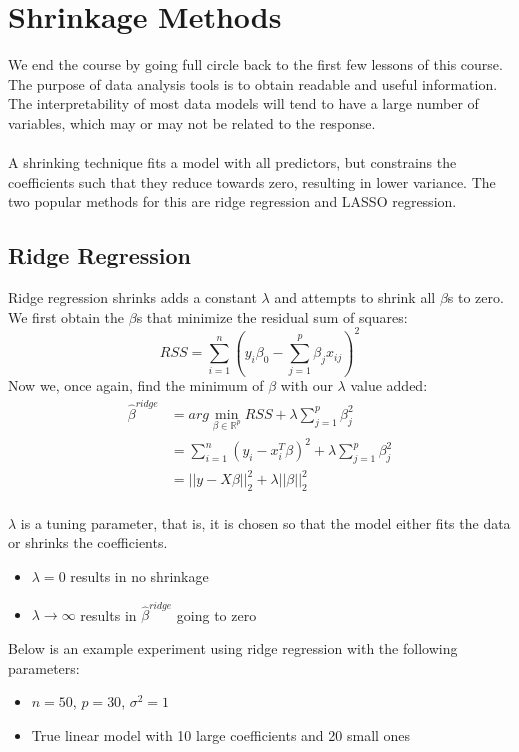 \documentclass[11pt]{article}
\begin{document}
\section{Shrinkage Methods}
We end the course by going full circle back to the first few lessons of this course. The purpose of data analysis tools is to obtain readable and useful information. The interpretability of most data models will tend to have a large number of variables, which may or may not be related to the response.
\\ \\
A shrinking technique fits a model with all predictors, but constrains the coefficients such that they reduce towards zero, resulting in lower variance. The two popular methods for this are ridge regression and LASSO regression.
\subsection{Ridge Regression}
Ridge regression shrinks adds a constant $\lambda$ and attempts to shrink all $\beta$s to zero. We first obtain the $\beta$s that minimize the residual sum of squares:
\begin{equation}
RSS = \sum_{i=1}^n(y_i  \beta_0 - \sum_{j=1}^p\beta_jx_{ij})^2
\end{equation}
Now we, once again, find the minimum of $\beta$ with our $\lambda$ value added:
\begin{align}\nonumber
\hat{\beta}^{ridge} &= arg\min_{\beta \in \mathbb{R}^p} RSS + \lambda\sum_{j=1}^p\beta_j^2\\\nonumber
&= \sum_{i=1}^n(y_i - x_i^T\beta)^2 + \lambda\sum_{j=1}^p\beta_j^2 \\ 
&= ||y - X\beta||_2^2 + \lambda||\beta||_2^2
\end{align}
\\ 
$\lambda$ is a tuning parameter, that is, it is chosen so that the model either fits the data or shrinks the coefficients. 
\begin{itemize}
\item $\lambda = 0$ results in no shrinkage
\item $\lambda \rightarrow \infty$ results in $\hat{\beta}^{ridge}$ going to zero 
\end{itemize}
Below is an example experiment using ridge regression with the following parameters:
\begin{itemize}
\item $n = 50$, $p = 30$, $\sigma^2 = 1$
\item True linear model with 10 large coefficients and 20 small ones
\end{itemize}
\end{document}
